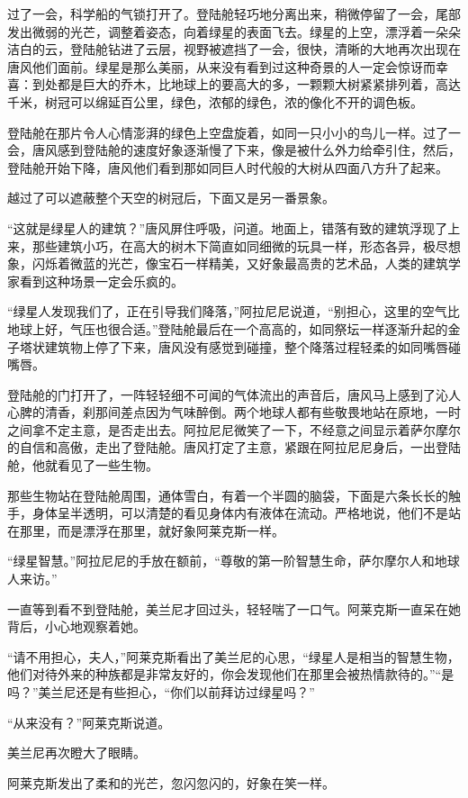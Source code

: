 过了一会，科学船的气锁打开了。登陆舱轻巧地分离出来，稍微停留了一会，尾部发出微弱的光芒，调整着姿态，向着绿星的表面飞去。绿星的上空，漂浮着一朵朵洁白的云，登陆舱钻进了云层，视野被遮挡了一会，很快，清晰的大地再次出现在唐风他们面前。绿星是那么美丽，从来没有看到过这种奇景的人一定会惊讶而幸喜：到处都是巨大的乔木，比地球上的要高大的多，一颗颗大树紧紧排列着，高达千米，树冠可以绵延百公里，绿色，浓郁的绿色，浓的像化不开的调色板。

登陆舱在那片令人心情澎湃的绿色上空盘旋着，如同一只小小的鸟儿一样。过了一会，唐风感到登陆舱的速度好象逐渐慢了下来，像是被什么外力给牵引住，然后，登陆舱开始下降，唐风他们看到那如同巨人时代般的大树从四面八方升了起来。

越过了可以遮蔽整个天空的树冠后，下面又是另一番景象。

“这就是绿星人的建筑？”唐风屏住呼吸，问道。地面上，错落有致的建筑浮现了上来，那些建筑小巧，在高大的树木下简直如同细微的玩具一样，形态各异，极尽想象，闪烁着微蓝的光芒，像宝石一样精美，又好象最高贵的艺术品，人类的建筑学家看到这种场景一定会乐疯的。

“绿星人发现我们了，正在引导我们降落，”阿拉尼尼说道，“别担心，这里的空气比地球上好，气压也很合适。”登陆舱最后在一个高高的，如同祭坛一样逐渐升起的金子塔状建筑物上停了下来，唐风没有感觉到碰撞，整个降落过程轻柔的如同嘴唇碰嘴唇。

登陆舱的门打开了，一阵轻轻细不可闻的气体流出的声音后，唐风马上感到了沁人心脾的清香，刹那间差点因为气味醉倒。两个地球人都有些敬畏地站在原地，一时之间拿不定主意，是否走出去。阿拉尼尼微笑了一下，不经意之间显示着萨尔摩尔的自信和高傲，走出了登陆舱。唐风打定了主意，紧跟在阿拉尼尼身后，一出登陆舱，他就看见了一些生物。

那些生物站在登陆舱周围，通体雪白，有着一个半圆的脑袋，下面是六条长长的触手，身体呈半透明，可以清楚的看见身体内有液体在流动。严格地说，他们不是站在那里，而是漂浮在那里，就好象阿莱克斯一样。

“绿星智慧。”阿拉尼尼的手放在额前，“尊敬的第一阶智慧生命，萨尔摩尔人和地球人来访。”

一直等到看不到登陆舱，美兰尼才回过头，轻轻喘了一口气。阿莱克斯一直呆在她背后，小心地观察着她。

“请不用担心，夫人，”阿莱克斯看出了美兰尼的心思，“绿星人是相当的智慧生物，他们对待外来的种族都是非常友好的，你会发现他们在那里会被热情款待的。”“是吗？”美兰尼还是有些担心，“你们以前拜访过绿星吗？”

“从来没有？”阿莱克斯说道。

美兰尼再次瞪大了眼睛。

阿莱克斯发出了柔和的光芒，忽闪忽闪的，好象在笑一样。


